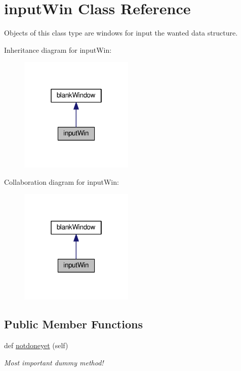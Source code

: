 \hypertarget{classcalc__ep_1_1inputWin}{}\section{input\+Win Class Reference}
\label{classcalc__ep_1_1inputWin}


Objects of this class type are windows for input the wanted data structure.  




Inheritance diagram for input\+Win\+:
\nopagebreak
\begin{figure}[H]
\begin{center}
\leavevmode
\includegraphics[width=154pt]{classcalc__ep_1_1inputWin__inherit__graph}
\end{center}
\end{figure}


Collaboration diagram for input\+Win\+:
\nopagebreak
\begin{figure}[H]
\begin{center}
\leavevmode
\includegraphics[width=154pt]{classcalc__ep_1_1inputWin__coll__graph}
\end{center}
\end{figure}
\subsection*{Public Member Functions}
\begin{DoxyCompactItemize}
\item 
def \hyperlink{classcalc__ep_1_1inputWin_a2d865a6aea10146f28c546bed4ae1f44}{notdoneyet} (self)\hypertarget{classcalc__ep_1_1inputWin_a2d865a6aea10146f28c546bed4ae1f44}{}\label{classcalc__ep_1_1inputWin_a2d865a6aea10146f28c546bed4ae1f44}

\begin{DoxyCompactList}\small\item\em Most important dummy method! \end{DoxyCompactList}\end{DoxyCompactItemize}


